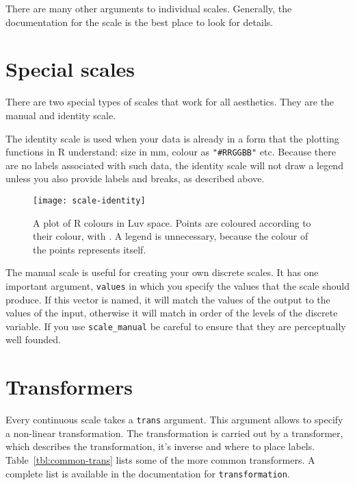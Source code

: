 There are many other arguments to individual scales.  Generally, the documentation for the scale is the best place to look for details.


\section{Special scales}
\label{sec:scale_special}

There are two special types of scales that work for all aesthetics.  They are the manual and identity scale.  

The identity scale is used when your data is already in a form that the plotting functions in R understand: size in mm, colour as \verb|"#RRGGBB"| etc. Because there are no labels associated with such data, the identity scale will not draw a legend unless you also provide labels and breaks, as described above. 

\begin{figure}[htbp]
  \centering
    \texttt{[image: scale-identity]}
  \caption{A plot of R colours in Luv space.  Points are coloured according to their colour, with .  A legend is unnecessary, because the colour of the points represents itself.}
  \label{fig:scale-identity}
\end{figure}

The manual scale is useful for creating your own discrete scales.  It has one important argument, \verb|values| in which you specify the values that the scale should produce.  If this vector is named, it will match the values of the output to the values of the input, otherwise it will match in order of the levels of the discrete variable.  If you use \verb|scale_manual| be careful to ensure that they are perceptually well founded.


\section{Transformers}
\label{sec:trans}

Every continuous scale takes a {\tt trans} argument.  This argument allows to specify a non-linear transformation.  The transformation is carried out by a transformer, which describes the transformation, it's inverse and where to place labels. Table~\ref{tbl:common-trans} lists some of the more common transformers. A complete list is available in the documentation for {\tt transformation}.

